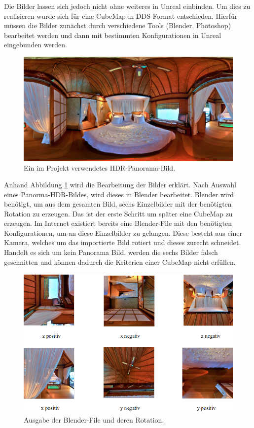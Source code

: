 Die Bilder lassen sich jedoch nicht ohne weiteres in Unreal einbinden. 
Um dies zu realisieren wurde sich für eine CubeMap in DDS-Format entschieden. 
Hierfür müssen die Bilder zunächst durch verschiedene Tools (Blender, Photoshop) bearbeitet werden und dann mit bestimmten Konfigurationen in Unreal eingebunden werden. \\

\begin{figure}[H] \centering
\includegraphics[width=\textwidth]{Images/hdr-panorama.png} 
\caption{Ein im Projekt verwendetes HDR-Panorama-Bild.}
\label{fig-hdr} 
\end{figure}


Anhand Abbildung \ref{fig-hdr} wird die Bearbeitung der Bilder erklärt. 
Nach Auswahl eines Panorma-HDR-Bildes, wird dieses in Blender bearbeitet. 
Blender wird benötigt, um aus dem gesamten Bild, sechs Einzelbilder mit der benötigten Rotation zu erzeugen. 
Das ist der erste Schritt um später eine CubeMap zu erzeugen. 
Im Internet existiert bereits eine Blender-File mit den benötigten Konfigurationen\cite{facerig19}, um an diese Einzelbilder zu gelangen. 
Diese besteht aus einer Kamera, welches um das importierte Bild rotiert und dieses zurecht schneidet. 
Handelt es sich um kein Panorama Bild, werden die sechs Bilder falsch geschnitten und können dadurch die Kriterien einer CubeMap nicht erfüllen. \\

\begin{figure}[H] \centering
\includegraphics[width=\textwidth]{Images/blender-bilder.png} 
\caption{Ausgabe der Blender-File und deren Rotation.}
\label{fig-blender-bilder} 
\end{figure}


